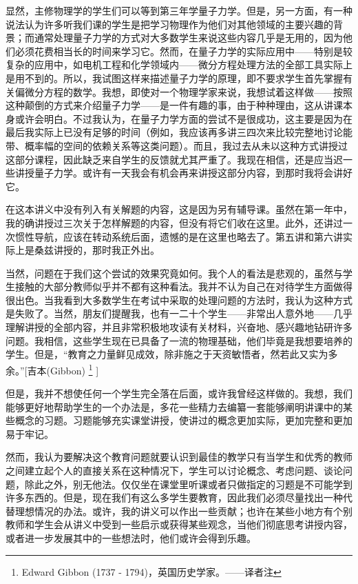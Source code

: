 \documentclass[UTF8, 12pt, a4paper, twoside]{ctexbook}
\begin{document}
显然，主修物理学的学生们可以等到第三年学量子力学。但是，另一方面，有一种说法认为许多听我们课的学生是把学习物理作为他们对其他领域的主要兴趣的背景；而通常处理量子力学的方式对大多数学生来说这些内容几乎是无用的，因为他们必须花费相当长的时间来学习它。然而，在量子力学的实际应用中——特别是较复杂的应用中，如电机工程和化学领域内——微分方程处理方法的全部工具实际上是用不到的。所以，我试图这样来描述量子力学的原理，即不要求学生首先掌握有关偏微分方程的数学。我想，即使对一个物理学家来说，我想试着这样做——按照这种颠倒的方式来介绍量子力学——是一件有趣的事，由于种种理由，这从讲课本身或许会明白。不过我认为，在量子力学方面的尝试不是很成功，这主要是因为在最后我实际上已没有足够的时间（例如，我应该再多讲三四次来比较完整地讨论能带、概率幅的空间的依赖关系等这类问题）。而且，我过去从未以这种方式讲授过这部分课程，因此缺乏来自学生的反馈就尤其严重了。我现在相信，还是应当迟一些讲授量子力学。或许有一天我会有机会再来讲授这部分内容，到那时我将会讲好它。
  
在这本讲义中没有列入有关解题的内容，这是因为另有辅导课。虽然在第一年中，我的确讲授过三次关于怎样解题的内容，但没有将它们收在这里。此外，还讲过一次惯性导航，应该在转动系统后面，遗憾的是在这里也略去了。第五讲和第六讲实际上是桑兹讲授的，那时我正外出。
  
当然，问题在于我们这个尝试的效果究竟如何。我个人的看法是悲观的，虽然与学生接触的大部分教师似乎并不都有这种看法。我并不认为自己在对待学生方面做得很出色。当我看到大多数学生在考试中采取的处理问题的方法时，我认为这种方式是失败了。当然，朋友们提醒我，也有一二十个学生——非常出人意外地——几乎理解讲授的全部内容，并且非常积极地攻读有关材料，兴奋地、感兴趣地钻研许多问题。我相信，这些学生现在已具备了一流的物理基础，他们毕竟是我想要培养的学生。但是，“教育之力量鲜见成效，除非施之于天资敏悟者，然若此又实为多余。”[吉本(Gibbon) \footnote{Edward Gibbon (1737 - 1794)，英国历史学家。——译者注} ]
  
但是，我并不想使任何一个学生完全落在后面，或许我曾经这样做的。我想，我们能够更好地帮助学生的一个办法是，多花一些精力去编纂一套能够阐明讲课中的某些概念的习题。习题能够充实课堂讲授，使讲过的概念更加实际，更加完整和更加易于牢记。

然而，我认为要解决这个教育问题就要认识到最佳的教学只有当学生和优秀的教师之间建立起个人的直接关系在这种情况下，学生可以讨论概念、考虑问题、谈论问题，除此之外，别无他法。仅仅坐在课堂里听课或者只做指定的习题是不可能学到许多东西的。但是，现在我们有这么多学生要教育，因此我们必须尽量找出一种代替理想情况的办法。或许，我的讲义可以作出一些贡献；也许在某些小地方有个别教师和学生会从讲义中受到一些启示或获得某些观念，当他们彻底思考讲授内容，或者进一步发展其中的一些想法时，他们或许会得到乐趣。
\end{document}
